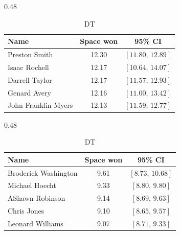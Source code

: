 \begin{table}[h!]
\centering
\begin{subtable}{0.48\textwidth}
\centering
\footnotesize
\begin{tabular}{lcc}
\toprule
Name & Space won & 95\% CI \\
\midrule
Preston Smith & 12.30 & $[11.80,\,12.89]$ \\
Isaac Rochell & 12.17 & $[10.64,\,14.07]$ \\
Darrell Taylor & 12.17 & $[11.57,\,12.93]$ \\
Genard Avery & 12.16 & $[11.00,\,13.42]$ \\
John Franklin-Myers & 12.13 & $[11.59,\,12.77]$ \\
\bottomrule
\end{tabular}
\caption{Edge}
\end{subtable}
\hfill
\begin{subtable}{0.48\textwidth}
\centering
\footnotesize
\begin{tabular}{lcc}
\toprule
Name & Space won & 95\% CI \\
\midrule
Broderick Washington & 9.61 & $[8.73,\,10.68]$ \\
Michael Hoecht & 9.33 & $[8.80,\,9.80]$ \\
AShawn Robinson & 9.14 & $[8.69,\,9.63]$ \\
Chris Jones & 9.10 & $[8.65,\,9.57]$ \\
Leonard Williams & 9.07 & $[8.71,\,9.33]$ \\
\bottomrule
\end{tabular}
\caption{DT}
\end{subtable}


\end{table}
